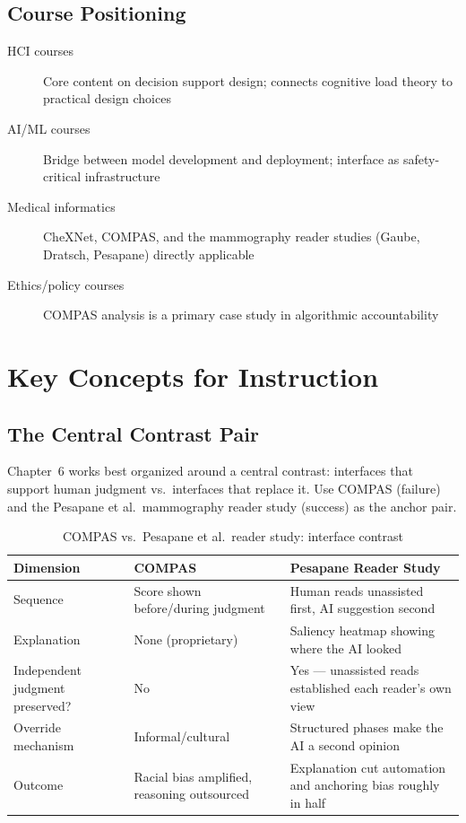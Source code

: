 \subsection{Course Positioning}

\begin{description}
    \item[HCI courses] Core content on decision support design; connects cognitive load theory to practical design choices
    \item[AI/ML courses] Bridge between model development and deployment; interface as safety-critical infrastructure
    \item[Medical informatics] CheXNet, COMPAS, and the mammography reader studies (Gaube, Dratsch, Pesapane) directly applicable
    \item[Ethics/policy courses] COMPAS analysis is a primary case study in algorithmic accountability
\end{description}

\section{Key Concepts for Instruction}

\subsection{The Central Contrast Pair}

Chapter~6 works best organized around a central contrast: interfaces that support human judgment vs.\ interfaces that replace it. Use COMPAS (failure) and the Pesapane et al.\ mammography reader study (success) as the anchor pair.

\begin{table}[htbp]
\caption{COMPAS vs.\ Pesapane et al.\ reader study: interface contrast}
\label{tab:contrast-ch06}
\centering
\begin{tabular}{@{}p{3cm}p{4cm}p{4cm}@{}}
\toprule
\textbf{Dimension} & \textbf{COMPAS} & \textbf{Pesapane Reader Study} \\
\midrule
Sequence & Score shown before/during judgment & Human reads unassisted first, AI suggestion second \\
Explanation & None (proprietary) & Saliency heatmap showing where the AI looked \\
Independent judgment preserved? & No & Yes --- unassisted reads established each reader's own view \\
Override mechanism & Informal/cultural & Structured phases make the AI a second opinion \\
Outcome & Racial bias amplified, reasoning outsourced & Explanation cut automation and anchoring bias roughly in half \\
\bottomrule
\end{tabular}
\end{table}

